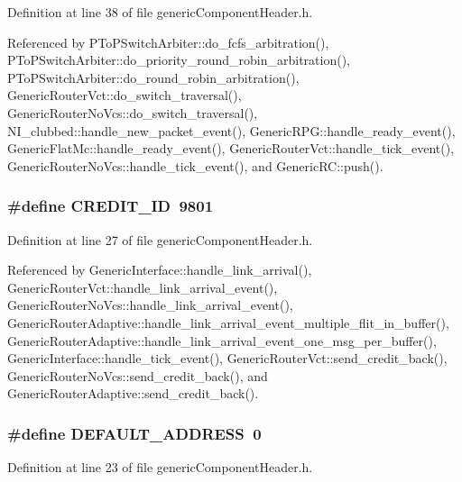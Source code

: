 Definition at line 38 of file genericComponentHeader.h.

Referenced by PToPSwitchArbiter::do\_\-fcfs\_\-arbitration(), PToPSwitchArbiter::do\_\-priority\_\-round\_\-robin\_\-arbitration(), PToPSwitchArbiter::do\_\-round\_\-robin\_\-arbitration(), GenericRouterVct::do\_\-switch\_\-traversal(), GenericRouterNoVcs::do\_\-switch\_\-traversal(), NI\_\-clubbed::handle\_\-new\_\-packet\_\-event(), GenericRPG::handle\_\-ready\_\-event(), GenericFlatMc::handle\_\-ready\_\-event(), GenericRouterVct::handle\_\-tick\_\-event(), GenericRouterNoVcs::handle\_\-tick\_\-event(), and GenericRC::push().
\subsubsection[{CREDIT\_\-ID}]{\setlength{\rightskip}{0pt plus 5cm}\#define CREDIT\_\-ID~9801}\label{genericComponentHeader_8h_2d879516eff32a88299e25eb5a377fee}




Definition at line 27 of file genericComponentHeader.h.

Referenced by GenericInterface::handle\_\-link\_\-arrival(), GenericRouterVct::handle\_\-link\_\-arrival\_\-event(), GenericRouterNoVcs::handle\_\-link\_\-arrival\_\-event(), GenericRouterAdaptive::handle\_\-link\_\-arrival\_\-event\_\-multiple\_\-flit\_\-in\_\-buffer(), GenericRouterAdaptive::handle\_\-link\_\-arrival\_\-event\_\-one\_\-msg\_\-per\_\-buffer(), GenericInterface::handle\_\-tick\_\-event(), GenericRouterVct::send\_\-credit\_\-back(), GenericRouterNoVcs::send\_\-credit\_\-back(), and GenericRouterAdaptive::send\_\-credit\_\-back().
\subsubsection[{DEFAULT\_\-ADDRESS}]{\setlength{\rightskip}{0pt plus 5cm}\#define DEFAULT\_\-ADDRESS~0}\label{genericComponentHeader_8h_838ee749ec1dfd8d73187bb32e9ec427}




Definition at line 23 of file genericComponentHeader.h.
